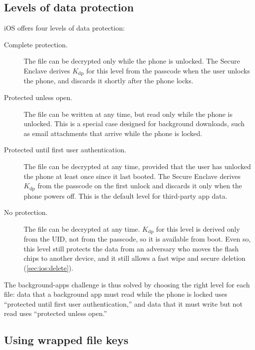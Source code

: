 \subsection{Levels of data protection}

iOS offers four levels of data protection:
\begin{description}
  \item[Complete protection.]
        The file can be decrypted only while the phone is unlocked.
        The Secure Enclave derives $K_\text{dp}$ for this level from the
        passcode when the user unlocks the phone, and discards it shortly
        after the phone locks.
  \item[Protected unless open.]
        The file can be written at any time, but read only while the phone
        is unlocked.
        This is a special case designed for background downloads, such as
        email attachments that arrive while the phone is locked.
  \item[Protected until first user authentication.]
        The file can be decrypted at any time, provided that the user has
        unlocked the phone at least once since it last booted.
        The Secure Enclave derives $K_\text{dp}$ from the passcode on the
        first unlock and discards it only when the phone powers off.
        This is the default level for third-party app data.
  \item[No protection.]
        The file can be decrypted at any time.
        $K_\text{dp}$ for this level is derived only from the UID, not from
        the passcode, so it is available from boot.
        Even so, this level still protects the data from an adversary who
        moves the flash chips to another device, and it still allows a
        fast wipe and secure deletion (\cref{sec:ios:delete}).
\end{description}
The background-apps challenge is thus solved by choosing the right level
for each file: data that a background app must read while the phone is
locked uses ``protected until first user authentication,'' and data that
it must write but not read uses ``protected unless open.''

\subsection{Using wrapped file keys}

